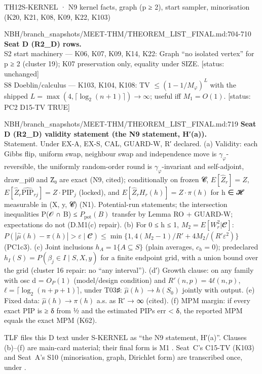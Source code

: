 \begin{card}{TH12}{S-KERNEL · N9 kernel facts, graph (p ≥ 2), start sampler, minorisation (K20, K21, K08, K09, K22, K103)}
\begin{stmt}{NBH/branch_snapshots/MEET-THM/THEOREM_LIST_FINAL.md:704-710}
\textbf{Seat D (R2\_D) rows.}\\
S2 start machinery — K06, K07, K09, K14, K22: Graph ``no isolated vertex'' for p ≥ 2 (cluster 19); K07 preservation only, equality under SIZE. [status: unchanged]\\
S8 Doeblin/calculus — K103, K104, K108: TV $≤ (1 − 1/M_φ)^L$ with the shipped $L = \max(4, ⌈\log_2(n+1)⌉) → ∞$; useful iff $M_1 = O(1)$. [status: PC2 D15-TV TRUE]
\end{stmt}

\begin{stmt}{NBH/branch_snapshots/MEET-THM/THEOREM_LIST_FINAL.md:719}
\textbf{Seat D (R2\_D) validity statement (the N9 statement, H′(a)).}\\
Statement. Under EX-A, EX-S, CAL, GUARD-W, R′ declared. (a) Validity: each Gibbs flip, uniform swap, neighbour swap and independence move is $γ_φ$-reversible, the uniformly random-order round is $γ_φ$-invariant and self-adjoint, draw\_pi0 and Z̄₀ are exact (N9, cited); conditionally on frozen 𝓒, $E[\hat{Z}_r] = Z$, $E[\hat{Z}_r \widehat{\mathrm{PIP}}_{rj}] = Z\cdot\mathrm{PIP}_j$ (locked), and $E[\hat{Z}_r H_r(h)] = Z\cdot π(h)$ for h ∈ 𝓗 measurable in (X, y, 𝓒) (N1). Potential-run statements; the intersection inequalities P(𝒪 ∩ B) ≤ $P_{\mathrm{pot}}(B)$ transfer by Lemma RO + GUARD-W; expectations do not (D.M1(c) repair). (b) For 0 ≤ h ≤ 1, $M_2 = E[W_r^2|𝓒]$: $P(|\hat{μ}(h) − π(h)| > ε \mid 𝓒) ≤ \min\{1, 4(M_2−1)/R′ + 4M_2/(R′ε^2)\}$ (PC1c3). (c) Joint inclusions $h_A = 1\{A ⊆ S\}$ (plain averages, $c_h = 0$); predeclared $h_I(S) = P(β_j ∈ I \mid S, X, y)$ for a finite endpoint grid, with a union bound over the grid (cluster 16 repair: no ``any interval''). (d′) Growth clause: on any family with osc d = $O_P(1)$ (model/design condition) and $R′(n,p) = 4ℓ(n,p)$, $ℓ = ⌈\log_2(n+p+1)⌉$, under T03♯: $\hat{μ}(h) → h(S_0)$ jointly with output. (e) Fixed data: $\hat{μ}(h) → π(h)$ a.s. as R′ → ∞ (cited). (f) MPM margin: if every exact PIP is ≥ δ from ½ and the estimated PIPs err < δ, the reported MPM equals the exact MPM (K62).
\end{stmt}
TLF files this D text under S-KERNEL as ``the N9 statement, H′(a)''. Clauses (b)--(f) are main-card material; their final form is M1 . Seat~C's C15-TV (K103) and Seat~A's S10 (minorisation, graph, Dirichlet form) are transcribed once, under   .


\end{card}
